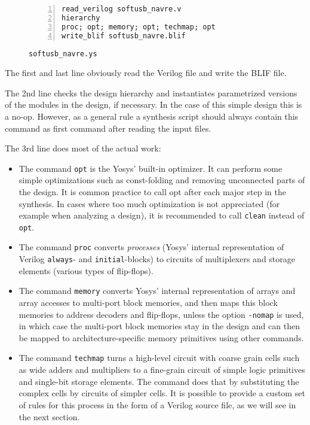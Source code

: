 \begin{figure}[H]
\begin{lstlisting}[frame=trBL,xleftmargin=1.5em,numbers=left]
read_verilog softusb_navre.v
hierarchy
proc; opt; memory; opt; techmap; opt
write_blif softusb_navre.blif
\end{lstlisting}
 \renewcommand{\figurename}{Listing}
\caption{\tt softusb\_navre.ys}
\end{figure}

The first and last line obviously read the Verilog file and write the BLIF
file. 

\medskip

The 2nd line checks the design hierarchy and instantiates parametrized 
versions of the modules in the design, if necessary. In the case of this
simple design this is a no-op. However, as a general rule a synthesis script
should always contain this command as first command after reading the input
files.

\medskip

The 3rd line does most of the actual work:

\begin{itemize}
\item The command {\tt opt} is the Yosys' built-in optimizer. It can perform
some simple optimizations such as const-folding and removing unconnected parts
of the design. It is common practice to call opt after each major step in the
synthesis. In cases where too much optimization is not appreciated (for example
when analyzing a design), it is recommended to call {\tt clean} instead of {\tt
opt}.
\item The command {\tt proc} converts {\it processes} (Yosys' internal
representation of Verilog {\tt always}- and {\tt initial}-blocks) to circuits
of multiplexers and storage elements (various types of flip-flops).
\item The command {\tt memory} converts Yosys' internal representation of 
arrays and array accesses to multi-port block memories, and then maps this
block memories to address decoders and flip-flops, unless the option {\tt -nomap}
is used, in which case the multi-port block memories stay in the design
and can then be mapped to architecture-specific memory primitives using
other commands.
\item The command {\tt techmap} turns a high-level circuit with coarse grain
cells such as wide adders and multipliers to a fine-grain circuit of simple
logic primitives and single-bit storage elements. The command does that by
substituting the complex cells by circuits of simpler cells. It is possible
to provide a custom set of rules for this process in the form of a Verilog
source file, as we will see in the next section.
\end{itemize}

